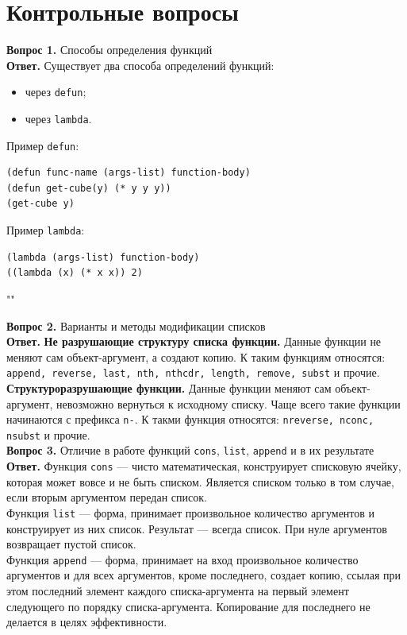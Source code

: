 \documentclass[12pt]{report}
\begin{document}
\section*{Контрольные вопросы}
\textbf{Вопрос 1.} Способы определения функций\\
\indent\textbf{Ответ.} Существует два способа определений функций:

\begin{itemize}
	\item через \texttt{defun};
	\item через \texttt{lambda}.
\end{itemize}

Пример \texttt{defun}:
\begin{lstlisting}
(defun func-name (args-list) function-body)
(defun get-cube(y) (* y y y))
(get-cube y)
\end{lstlisting}

Пример \texttt{lambda}:
\begin{lstlisting}
(lambda (args-list) function-body)
((lambda (x) (* x x)) 2)
\end{lstlisting} ""\newline

\indent \textbf{Вопрос 2.} Варианты и методы модификации списков\\
\indent\textbf{Ответ. }\textbf{Не разрушающие структуру списка функции.} Данные функции не меняют сам объект-аргумент, а создают копию. К таким функциям относятся: 
\texttt{append, reverse, last, nth, nthcdr, length, remove, subst} и прочие.\\

\indent \textbf{Структуроразрушающие функции.} Данные функции меняют сам объект-аргумент, невозможно вернуться к исходному списку. Чаще всего такие функции начинаются с префикса \texttt{n-}. К такми функция относятся: \texttt{nreverse, nconc, nsubst} и прочие.\\

\textbf{Вопрос 3.} Отличие в работе функций \texttt{cons}, \texttt{list}, \texttt{append} и в их результате\\
\indent\textbf{Ответ. }Функция \texttt{cons} --- чисто математическая, конструирует списковую ячейку, которая может вовсе и не быть списком. Является списком только в том случае, если вторым аргументом передан список.\\

Функция \texttt{list} --- форма, принимает произвольное количество аргументов и конструирует из них список. Результат --- всегда список. При нуле аргументов возвращает пустой список.\\

Функция \texttt{append} --- форма, принимает на вход произвольное количество аргументов и для всех аргументов, кроме последнего, создает копию, ссылая при этом последний элемент каждого списка-аргумента на первый элемент следующего по порядку списка-аргумента. Копирование для последнего не делается в целях эффективности.\\

	
	
	
	
\end{document}
